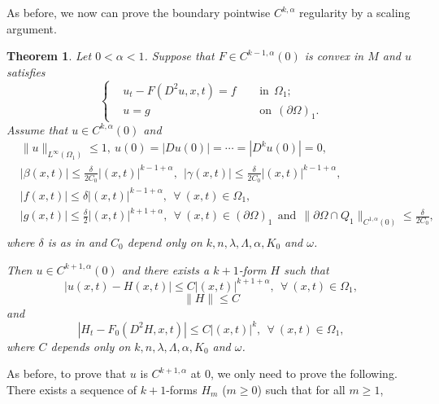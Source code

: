 \documentclass[preprint,12pt]{elsarticle}
\newtheorem{theorem}{Theorem}[section]
\theoremstyle{definition}
\theoremstyle{remark}
\numberwithin{equation}{section}
\begin{document}
As before, we now can prove the boundary pointwise $C^{k,\alpha}$ regularity by a scaling argument.
\begin{theorem}\label{t.Cka.S}
Let $0<\alpha <1$. Suppose that $F\in C^{k-1,\alpha}(0)$ is convex in $M$ and $u$ satisfies
\begin{equation*}
\left\{\begin{aligned}
&u_t-F(D^2u,x,t)=f&& ~~\mbox{in}~~\Omega_1;\\
&u=g&& ~~\mbox{on}~~(\partial \Omega)_1.
\end{aligned}\right.
\end{equation*}
Assume that $u\in C^{k,\alpha}(0)$ and
\begin{equation}\label{e.tCkas-be}
\begin{aligned}
&\|u\|_{L^{\infty}(\Omega_1)}\leq 1,~ u(0)=|Du(0)|=\cdots=|D^{k}u(0)|=0,\\
&|\beta(x,t)|\leq \frac{\delta}{2C_0}|(x,t)|^{k-1+\alpha}, ~~|\gamma(x,t)|\leq \frac{\delta}{2C_0}|(x,t)|^{k-1+\alpha},\\
&|f(x,t)|\leq \delta|(x,t)|^{k-1+\alpha}, ~~\forall ~(x,t)\in \Omega_1,\\
&|g(x,t)|\leq \frac{\delta}{2}|(x,t)|^{k+1+\alpha}, ~~\forall ~(x,t)\in (\partial \Omega)_1
~~\mbox{and}~~\|\partial \Omega\cap Q_1\|_{C^{1,\alpha}(0)} \leq \frac{\delta}{2C_0},\\
\end{aligned}
\end{equation}
where $\delta$ is as in  and $C_0$ depend only on $k,n,\lambda, \Lambda,\alpha,K_0$ and $\omega$.

Then $u\in C^{k+1,\alpha}(0)$ and there exists a $k+1$-form $H$ such that
\begin{equation}\label{e.tCkas-1}
  |u(x,t)-H(x,t)|\leq C |(x,t)|^{k+1+\alpha}, ~~\forall ~(x,t)\in \Omega_{1},
\end{equation}
\begin{equation}\label{e.tCkas-2}
\|H\|\leq C
\end{equation}
and
\begin{equation*}
  |H_t-F_0(D^2H,x,t)|\leq C |(x,t)|^{k}, ~~\forall ~(x,t)\in \Omega_{1},
\end{equation*}
where $C$ depends only on $k,n,\lambda, \Lambda,\alpha,K_0$ and $\omega$.
\end{theorem}

\proof As before, to prove that $u$ is $C^{k+1,\alpha}$ at $0$, we only need to prove the following. There exists a sequence of $k+1$-forms $H_m$ ($m\geq 0$) such that for all $m\geq 1$,
\end{document}
